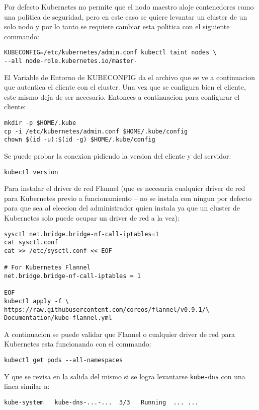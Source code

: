 Por defecto Kubernetes no permite que el nodo maestro aloje contenedores como una politica de seguridad, pero en este caso se quiere levantar un cluster de un solo nodo y por lo tanto se requiere cambiar esta politica con el siguiente commando:
    \begin{lstlisting}
KUBECONFIG=/etc/kubernetes/admin.conf kubectl taint nodes \
--all node-role.kubernetes.io/master-
    \end{lstlisting}
El Variable de Entorno de KUBECONFIG da el archivo que se ve a continuacion que autentica el cliente con el cluster. Una vez que se configura bien el cliente, este mismo deja de ser necesario. Entonces a continuacion para configurar el cliente:
    \begin{lstlisting}
mkdir -p $HOME/.kube
cp -i /etc/kubernetes/admin.conf $HOME/.kube/config
chown $(id -u):$(id -g) $HOME/.kube/config
    \end{lstlisting}

Se puede probar la conexion pidiendo la version del cliente y del servidor:
\begin{lstlisting}
kubectl version
\end{lstlisting}

Para instalar el driver de red Flannel (que es necesaria cualquier driver de red para Kubernetes previo a funcionamiento -- no se instala con ningun por defecto para que sea al eleccion del administrador quien instala ya que un cluster de Kubernetes solo puede ocupar un driver de red a la vez):
\begin{lstlisting}
sysctl net.bridge.bridge-nf-call-iptables=1
cat sysctl.conf
cat >> /etc/sysctl.conf << EOF

# For Kubernetes Flannel
net.bridge.bridge-nf-call-iptables = 1

EOF
kubectl apply -f \
https://raw.githubusercontent.com/coreos/flannel/v0.9.1/\
Documentation/kube-flannel.yml
\end{lstlisting}

A continuacion se puede validar que Flannel o cualquier driver de red para Kubernetes esta funcionando con el commando:
\begin{lstlisting}
kubectl get pods --all-namespaces
\end{lstlisting}
Y que se revisa en la salida del mismo si se logra levantarse \texttt{kube-dns} con una linea similar a:
\begin{lstlisting}
kube-system   kube-dns-...-...  3/3   Running  ... ...
\end{lstlisting}

